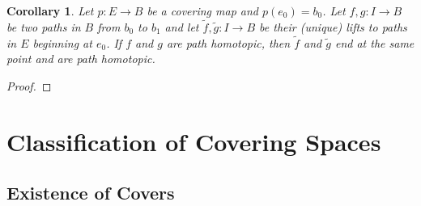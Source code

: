 \documentclass[10pt]{article}
\theoremstyle{thmstyle}
\theoremstyle{defstyle}
\newtheorem{corollary}[theorem]{Corollary}
\newcommand{\wt}[1]{\widetilde{#1}}
\begin{document}
\begin{corollary}
    Let $p: E\to B$ be a covering map and $p(e_0) = b_0$. Let $f, g: I\to B$ be two paths in $B$ from $b_0$ to $b_1$ and let $\wt f, \wt g: I\to B$ be their (unique) lifts to paths in $E$ beginning at $e_0$. If $f$ and $g$ are path homotopic, then $\wt f$ and $\wt g$ end at the same point and are path homotopic.
\end{corollary}
\begin{proof}
    
\end{proof}

\section{Classification of Covering Spaces}

\subsection{Existence of Covers}
\end{document}
